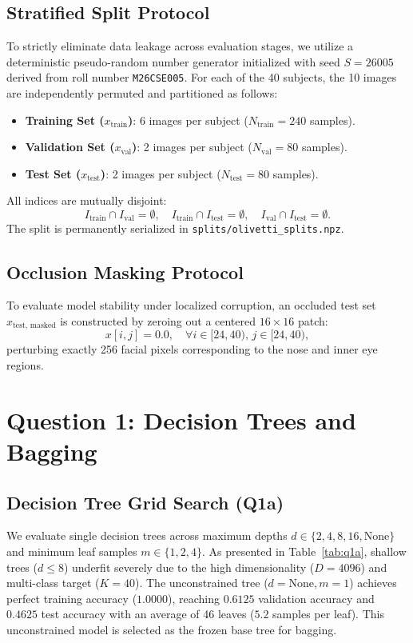 \documentclass[10pt,twocolumn,letterpaper]{article}
\begin{document}
\subsection{Stratified Split Protocol}
To strictly eliminate data leakage across evaluation stages, we utilize a deterministic pseudo-random number generator initialized with seed $S = 26005$ derived from roll number \texttt{M26CSE005}. For each of the 40 subjects, the 10 images are independently permuted and partitioned as follows:
\begin{itemize}
    \item \textbf{Training Set ($x_{\text{train}}$)}: 6 images per subject ($N_{\text{train}} = 240$ samples).
    \item \textbf{Validation Set ($x_{\text{val}}$)}: 2 images per subject ($N_{\text{val}} = 80$ samples).
    \item \textbf{Test Set ($x_{\text{test}}$)}: 2 images per subject ($N_{\text{test}} = 80$ samples).
\end{itemize}
All indices are mutually disjoint:
\begin{equation}
    I_{\text{train}} \cap I_{\text{val}} = \emptyset, \quad I_{\text{train}} \cap I_{\text{test}} = \emptyset, \quad I_{\text{val}} \cap I_{\text{test}} = \emptyset.
\end{equation}
The split is permanently serialized in \texttt{splits/olivetti\_splits.npz}.

\subsection{Occlusion Masking Protocol}
To evaluate model stability under localized corruption, an occluded test set $x_{\text{test, masked}}$ is constructed by zeroing out a centered $16 \times 16$ patch:
\begin{equation}
    x[i, j] = 0.0, \quad \forall i \in [24, 40), \, j \in [24, 40),
\end{equation}
perturbing exactly 256 facial pixels corresponding to the nose and inner eye regions.

\section{Question 1: Decision Trees and Bagging}
\label{sec:q1}

\subsection{Decision Tree Grid Search (Q1a)}
We evaluate single decision trees across maximum depths $d \in \{2, 4, 8, 16, \text{None}\}$ and minimum leaf samples $m \in \{1, 2, 4\}$. As presented in Table~\ref{tab:q1a}, shallow trees ($d \le 8$) underfit severely due to the high dimensionality ($D=4096$) and multi-class target ($K=40$). The unconstrained tree ($d=\text{None}, m=1$) achieves perfect training accuracy ($1.0000$), reaching $0.6125$ validation accuracy and $0.4625$ test accuracy with an average of 46 leaves ($5.2$ samples per leaf). This unconstrained model is selected as the frozen base tree for bagging.
\end{document}
